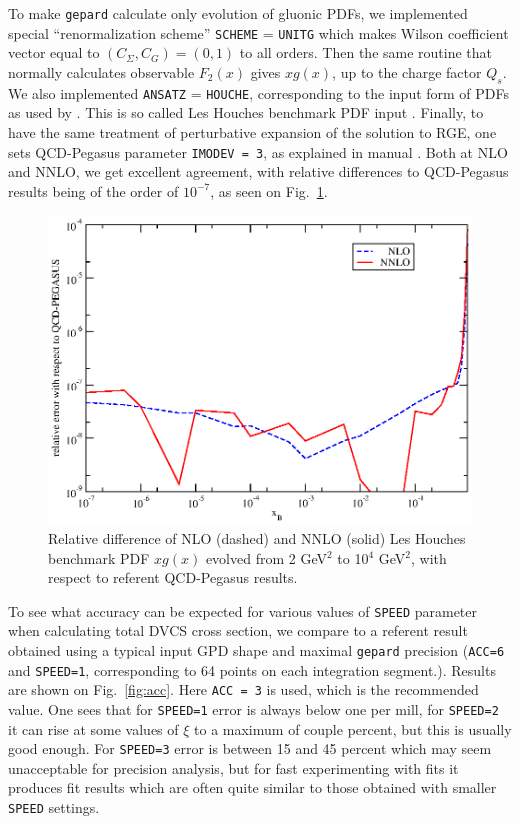 \documentclass[12pt]{article}
\begin{document}
To make \texttt{gepard} calculate only evolution of gluonic PDFs, we implemented special
``renormalization scheme'' \texttt{SCHEME} = \texttt{UNITG} which
makes Wilson coefficient vector equal to $(C_{\Sigma}, C_G) = (0, 1)$
to all orders. Then the same routine that normally calculates observable $F_2(x)$ gives $x g(x)$, up
to the charge factor $Q_s$. We also implemented \texttt{ANSATZ} = \texttt{HOUCHE}, corresponding to the
input form of PDFs as used by \cite{Vogt:2004ns}. This is so called Les Houches benchmark PDF
input \cite{Giele:2002hx}.  Finally, to have the same treatment of perturbative expansion of
the solution to RGE, one sets {\sc QCD-Pegasus} parameter \texttt{IMODEV = 3}, as explained in
manual \cite{Vogt:2004ns}. 
Both at NLO and NNLO, we get excellent agreement, with relative differences to
{\sc QCD-Pegasus} results being of the order of $10^{-7}$, as seen on
Fig.~\ref{fig:PDFevol}.


\begin{figure}
\begin{center}
\includegraphics[scale=0.8]{PDFevol}
\end{center}
\caption{Relative difference of NLO (dashed) and NNLO (solid) Les Houches benchmark PDF $x g(x)$
evolved from 2 GeV$^2$ to 10$^4$ GeV$^2$, with respect to referent {\sc QCD-Pegasus} 
\cite{Vogt:2004ns} results.}
\label{fig:PDFevol}
\end{figure}

To see what accuracy can be expected for various values of \texttt{SPEED} parameter 
when calculating total
DVCS cross section, we compare to a referent result obtained using a typical input GPD shape and
maximal \texttt{gepard} precision (\texttt{ACC=6} and \texttt{SPEED=1}, corresponding to
64 points on each integration segment.). Results are shown on
Fig.~\ref{fig:acc}. Here \texttt{ACC = 3} is used, which is the recommended value.
One sees that for  \texttt{SPEED=1} error is always below one per mill, for
\texttt{SPEED=2} it can rise at some values of $\xi$ to a maximum of couple percent, 
but this is usually good
enough. For \texttt{SPEED=3} error is between 15 and 45 percent which may seem
unacceptable for precision analysis, but for fast experimenting with fits it
produces fit results which are often quite similar to those obtained with
smaller \texttt{SPEED} settings.
\end{document}
